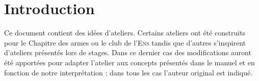 \section*{Introduction}


Ce document contient des idées d'ateliers.
Certains ateliers ont été construits pour le Chapitre des armes ou le club de l'\textsc{Ens} tandis que d'autres s'inspirent d'ateliers présentés lors de stages.
Dans ce dernier cas des modifications auront été apportées pour adapter l'atelier aux concepts présentés dans le manuel et en fonction de notre interprétation ; dans tous les cas l'auteur original est indiqué.


